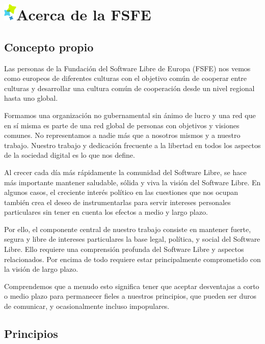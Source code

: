 \documentclass[10pt,foldmark,tumble]{leaflet}
\begin{document}
\section{\includegraphics{item.png}Acerca de la FSFE}

  \subsection{Concepto propio}

Las personas de la Fundación del Software Libre de Europa (FSFE) nos vemos como europeos de diferentes culturas con el objetivo común de cooperar entre culturas y desarrollar una cultura común de cooperación desde un nivel regional hasta uno global.

Formamos una organización no gubernamental sin ánimo de lucro y una red que en sí misma es parte de una red global de personas con objetivos y visiones comunes. No representamos a nadie más que a nosotros mismos y a nuestro trabajo. Nuestro trabajo y dedicación frecuente a la libertad en todos los aspectos de la sociedad digital es lo que nos define.

Al crecer cada día más rápidamente la comunidad del Software Libre, se hace más importante mantener saludable, sólida y viva la visión del Software Libre. En algunos casos, el creciente interés político en las cuestiones que nos ocupan también crea el deseo de instrumentarlas para servir intereses personales particulares sin tener en cuenta los efectos a medio y largo plazo.

Por ello, el componente central de nuestro trabajo consiste en mantener fuerte, segura y libre de intereses particulares la base legal, política, y social del Software Libre. Ello requiere una comprensión profunda del Software Libre y aspectos relacionados. Por encima de todo requiere estar principalmente comprometido con la visión de largo plazo.

Comprendemos que a menudo esto significa tener que aceptar desventajas a corto o medio plazo para permanecer fieles a nuestros principios, que pueden ser duros de comunicar, y ocasionalmente incluso impopulares.

  \subsection{Principios}
\end{document}
